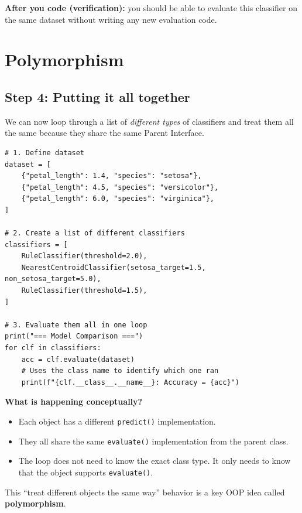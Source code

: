 \noindent
\textbf{After you code (verification):} you should be able to evaluate this classifier on the same dataset without writing any new evaluation code.


\section{Polymorphism}


\subsection{Step 4: Putting it all together}
We can now loop through a list of \textit{different types} of classifiers and treat them all the same because they share the same Parent Interface.

\begin{verbatim}
# 1. Define dataset
dataset = [
    {"petal_length": 1.4, "species": "setosa"},
    {"petal_length": 4.5, "species": "versicolor"},
    {"petal_length": 6.0, "species": "virginica"},
]

# 2. Create a list of different classifiers
classifiers = [
    RuleClassifier(threshold=2.0),
    NearestCentroidClassifier(setosa_target=1.5, non_setosa_target=5.0),
    RuleClassifier(threshold=1.5),
]

# 3. Evaluate them all in one loop
print("=== Model Comparison ===")
for clf in classifiers:
    acc = clf.evaluate(dataset)
    # Uses the class name to identify which one ran
    print(f"{clf.__class__.__name__}: Accuracy = {acc}")
\end{verbatim}
\noindent
\textbf{What is happening conceptually?}
\begin{itemize}\setlength{\itemsep}{2pt}
    \item Each object has a different \texttt{predict()} implementation.
    \item They all share the same \texttt{evaluate()} implementation from the parent class.
    \item The loop does not need to know the exact class type. It only needs to know that the object supports \texttt{evaluate()}.
\end{itemize}
\noindent
This ``treat different objects the same way'' behavior is a key OOP idea called \textbf{polymorphism}.

